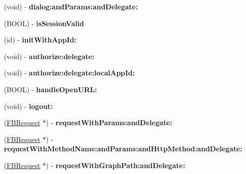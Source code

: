 \begin{DoxyCompactItemize}
\item 
\hypertarget{interface_facebook_a1912857d2083d698ee82dfe17346e6a4}{
(void) -\/ {\bfseries dialog\-:and\-Params\-:and\-Delegate\-:}}
\label{interface_facebook_a1912857d2083d698ee82dfe17346e6a4}

\item 
\hypertarget{interface_facebook_a6178476bc78da9727d4f2b32b9663a9a}{
(\-B\-O\-O\-L) -\/ {\bfseries is\-Session\-Valid}}
\label{interface_facebook_a6178476bc78da9727d4f2b32b9663a9a}

\item 
\hypertarget{interface_facebook_aa85460ff62b6bf81946548b7983b931d}{
(id) -\/ {\bfseries init\-With\-App\-Id\-:}}
\label{interface_facebook_aa85460ff62b6bf81946548b7983b931d}

\item 
\hypertarget{interface_facebook_ae8e4829a8dbf6270c1fa9ee66726560c}{
(void) -\/ {\bfseries authorize\-:delegate\-:}}
\label{interface_facebook_ae8e4829a8dbf6270c1fa9ee66726560c}

\item 
\hypertarget{interface_facebook_a6f8b7a7d0999024180dcdee71dba1dfe}{
(void) -\/ {\bfseries authorize\-:delegate\-:local\-App\-Id\-:}}
\label{interface_facebook_a6f8b7a7d0999024180dcdee71dba1dfe}

\item 
\hypertarget{interface_facebook_af59e46399f97cdb3f7f235822a30f06f}{
(\-B\-O\-O\-L) -\/ {\bfseries handle\-Open\-U\-R\-L\-:}}
\label{interface_facebook_af59e46399f97cdb3f7f235822a30f06f}

\item 
\hypertarget{interface_facebook_a204f10894608b3e10943e15d9861c9be}{
(void) -\/ {\bfseries logout\-:}}
\label{interface_facebook_a204f10894608b3e10943e15d9861c9be}

\item 
\hypertarget{interface_facebook_abda41d7c75de5231b460869564a4148c}{
(\hyperlink{interface_f_b_request}{\-F\-B\-Request} $\ast$) -\/ {\bfseries request\-With\-Params\-:and\-Delegate\-:}}
\label{interface_facebook_abda41d7c75de5231b460869564a4148c}

\item 
\hypertarget{interface_facebook_abdd8888ceec0cc9641b3939345cb71bb}{
(\hyperlink{interface_f_b_request}{\-F\-B\-Request} $\ast$) -\/ {\bfseries request\-With\-Method\-Name\-:and\-Params\-:and\-Http\-Method\-:and\-Delegate\-:}}
\label{interface_facebook_abdd8888ceec0cc9641b3939345cb71bb}

\item 
\hypertarget{interface_facebook_ade34a729c134bba23ad8a432346a52b3}{
(\hyperlink{interface_f_b_request}{\-F\-B\-Request} $\ast$) -\/ {\bfseries request\-With\-Graph\-Path\-:and\-Delegate\-:}}
\label{interface_facebook_ade34a729c134bba23ad8a432346a52b3}


\end{DoxyCompactItemize}
